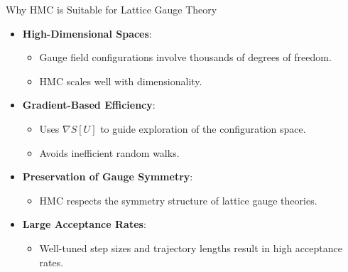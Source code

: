 \documentclass{beamer}
\begin{document}
\begin{frame}{Why HMC is Suitable for Lattice Gauge Theory}
  \begin{itemize}
      \item \textbf{High-Dimensional Spaces}:
      \begin{itemize}
          \item Gauge field configurations involve thousands of degrees of freedom.
          \item HMC scales well with dimensionality.
      \end{itemize}
      \item \textbf{Gradient-Based Efficiency}:
      \begin{itemize}
          \item Uses \(\nabla S[U]\) to guide exploration of the configuration space.
          \item Avoids inefficient random walks.
      \end{itemize}
      \item \textbf{Preservation of Gauge Symmetry}:
      \begin{itemize}
          \item HMC respects the symmetry structure of lattice gauge theories.
      \end{itemize}
      \item \textbf{Large Acceptance Rates}:
      \begin{itemize}
          \item Well-tuned step sizes and trajectory lengths result in high acceptance rates.
      \end{itemize}
  \end{itemize}
\end{frame}
\end{document}
